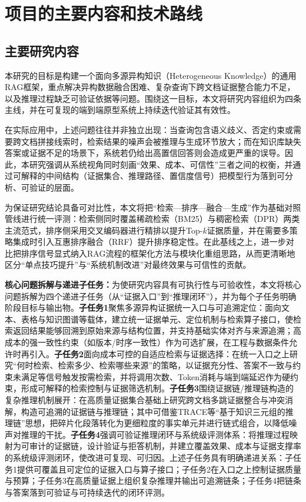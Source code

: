 \section{项目的主要内容和技术路线}

\subsection{主要研究内容}
本研究的目标是构建一个面向多源异构知识（Heterogeneous Knowledge）的通用RAG框架，重点解决异构数据融合困难、复杂查询下跨文档证据整合能力不足，以及推理过程缺乏可验证依据等问题。围绕这一目标，本文将研究内容组织为四条主线，并在可复现的端到端原型系统上持续迭代验证其有效性。

在实际应用中，上述问题往往并非独立出现：当查询包含语义歧义、否定约束或需要跨文档拼接线索时，检索结果的噪声会被推理与生成环节放大；而在知识库缺失答案或证据不足的场景下，系统若仍给出高置信回答则会造成更严重的误导。因此，本研究强调从系统视角同时刻画“效果、成本、可信性”三者之间的权衡，并通过可解释的中间结构（证据集合、推理路径、置信度信号）把模型行为落到可分析、可验证的层面。

为保证研究结论具备可对比性，本文将把“检索—排序—融合—生成”作为基础对照管线进行统一评测：检索侧同时覆盖稀疏检索（BM25）与稠密检索（DPR）两类主流范式\cite{bm25, ref6}，排序侧采用交叉编码器进行精排以提升Top-$k$证据质量\cite{bert_rerank}，并在需要多策略集成时引入互惠排序融合（RRF）提升排序稳定性\cite{rrf}。在此基线之上，进一步对比把排序信号显式纳入RAG流程的框架化方法\cite{ref10}与模块化重组思路\cite{ref27}，从而更清晰地区分“单点技巧提升”与“系统机制改进”对最终效果与可信性的贡献。

\textbf{核心问题拆解与递进子任务：}为使研究内容具有可执行性与可验收性，本文将核心问题拆解为四个递进子任务（从“证据入口”到“推理闭环”），并为每个子任务明确阶段目标与输出物。\textbf{子任务1}聚焦多源异构证据统一入口与可追溯定位：面向文本、表格与知识图谱等载体，建立统一证据单元、定位机制与检索算子接口，使检索返回结果能够回溯到原始来源与结构位置，并支持基础实体对齐与来源追溯；高成本的强一致性约束（如版本/时序一致性）作为可选扩展，在工程与数据条件允许时再引入。\textbf{子任务2}面向成本可控的自适应检索与证据选择：在统一入口之上研究“何时检索、检索多少、检索哪些来源”的策略，以证据充分性、答案不一致与约束未满足等信号触发按需检索，并将调用次数、Token消耗与端到端延迟作为硬约束，形成可解释的检索控制与证据筛选机制\cite{ref8, ref12}。\textbf{子任务3}围绕证据链/推理链构造的复杂推理机制展开：在高质量证据集合基础上研究跨文档多跳证据整合与冲突消解，构造可追溯的证据链与推理链；其中可借鉴TRACE\cite{trace}等“基于知识三元组的推理链”思想，把碎片化段落转化为更细粒度的事实单元并进行链式组合，以降低噪声对推理的干扰。\textbf{子任务4}强调可验证推理闭环与系统级评测体系：将推理过程映射为可审计的证据链，设计验证与拒答机制，并建立覆盖效果、成本与证据支撑率的系统级评测闭环，使改进可复现、可归因\cite{ref24, ref25}。上述子任务具有明确递进关系：子任务1提供可覆盖且可定位的证据入口与算子接口；子任务2在入口之上控制证据质量与预算；子任务3在高质量证据上组织复杂推理并输出可追溯链条；子任务4把链条与答案落到可验证与可持续迭代的闭环评测。

